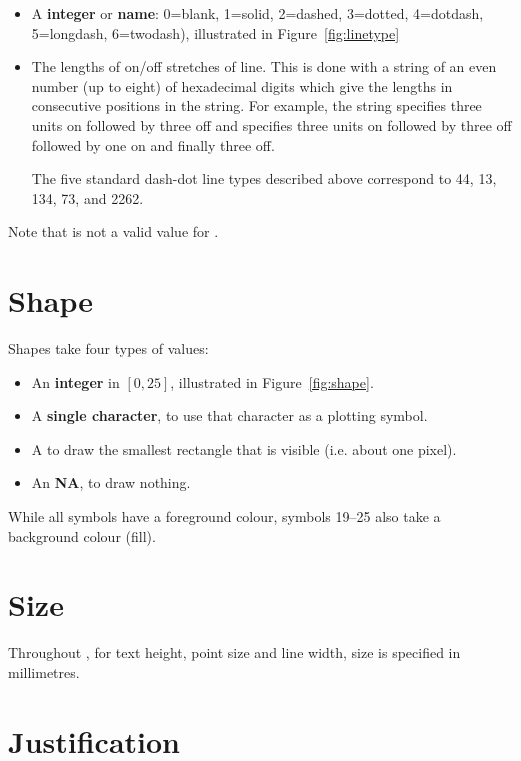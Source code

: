 \begin{itemize}
  \item A {\bf integer} or {\bf name}: 0=blank, 1=solid, 2=dashed, 3=dotted, 4=dotdash, 5=longdash, 6=twodash), illustrated in Figure~\ref{fig:linetype}

  \item The lengths of on/off stretches of line. This is done with a string of an even number (up to eight) of hexadecimal digits which give the lengths in consecutive positions in the string. For example, the string  specifies three units on followed by three off and  specifies three units on followed by three off followed by one on and finally three off. 
  
  The five standard dash-dot line types described above correspond to 44, 13, 134, 73, and 2262.
\end{itemize} 

Note that  is not a valid value for .

\section{Shape}
\label{sec:shape_spec}

Shapes take four types of values:

\begin{itemize}
  \item An {\bf integer} in $[0, 25]$, illustrated in Figure~\ref{fig:shape}.

  \item A {\bf single character}, to use that character as a plotting symbol.   

  \item A  to draw the smallest rectangle that is visible (i.e. about one pixel).
  
  \item An {\bf NA}, to draw nothing.
\end{itemize}

While all symbols have a foreground colour, symbols 19--25 also take a background colour (fill). 

\section{Size}
\label{sec:size}

Throughout \ggplot, for text height, point size and line width, size is specified in millimetres.

\section{Justification}
\label{sec:justification_spec}

